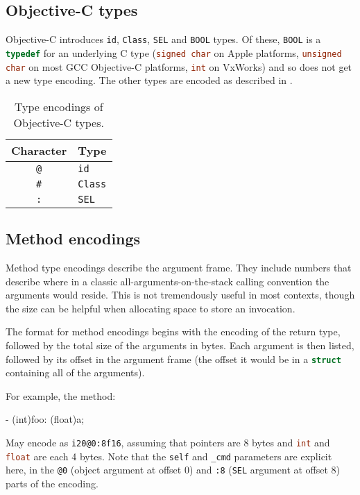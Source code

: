 \documentclass[a4paper]{report}
\newcommand{\ccode}[1]{\lstinline[language={C}]{#1}}
\newcommand{\objc}[1]{\lstinline[language={[Objective]C}]{#1}}
\begin{document}
\subsection{Objective-C types}

Objective-C introduces \objc{id}, \objc{Class}, \objc{SEL} and \objc{BOOL} types.
Of these, \objc{BOOL} is a \ccode{typedef} for an underlying C type (\ccode{signed char} on Apple platforms, \ccode{unsigned char} on most GCC Objective-C platforms, \ccode{int} on VxWorks) and so does not get a new type encoding.
The other types are encoded as described in .

\begin{table}
	\begin{center}
		\begin{tabular}{c|l}
			Character   & Type\\\hline
			\texttt{@}  & \objc{id} \\
			\texttt{\#} & \objc{Class} \\
			\texttt{:}  & \objc{SEL}
		\end{tabular}
		\caption{\label{tab:objcencode}Type encodings of Objective-C types.}
	\end{center}
\end{table}


\subsection{Method encodings}

Method type encodings describe the argument frame.
They include numbers that describe where in a classic all-arguments-on-the-stack calling convention the arguments would reside.
This is not tremendously useful in most contexts, though the size can be helpful when allocating space to store an invocation.

The format for method encodings begins with the encoding of the return type, followed by the total size of the arguments in bytes.
Each argument is then listed, followed by its offset in the argument frame (the offset it would be in a \ccode{struct} containing all of the arguments).

For example, the method:
\begin{codesnippet}
- (int)foo: (float)a;
\end{codesnippet}

May encode as \texttt{i20@0:8f16}, assuming that pointers are 8 bytes and \ccode{int} and \ccode{float} are each 4 bytes.
Note that the \objc{self} and \objc{_cmd} parameters are explicit here, in the \texttt{@0} (object argument at offset 0) and \texttt{:8} (\objc{SEL} argument at offset 8) parts of the encoding.
\end{document}
